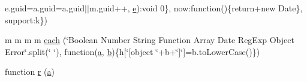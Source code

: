 \begin{DoxyCompactItemize}
e.\+guid=a.\+guid=a.\+guid$\vert$$\vert$m.\+guid++, \hyperlink{jquery_8canvasjs_8min_8js_a2c038346d47955cbe2cb91e338edd7e1}{e})\+:void 0\}, now\+:function()\{return+new Date\}, support\+:k\})
\item 
m m m m \hyperlink{jquery-1_811_82_8min_8js_a18d9b499a0765bf2fe5f372ff2fc0236}{each} (\char`\"{}Boolean Number String Function Array Date Reg\+Exp Object Error\char`\"{}.split(\char`\"{} \char`\"{}), function(\hyperlink{bootstrap_8min_8js_a1f5870dcf487187f13d5fd328ed9e6e7}{a}, \hyperlink{bootstrap_8min_8js_a398bb8542498d1b14178b02b99df309b}{b})\{h\mbox{[}\char`\"{}\mbox{[}object \char`\"{}+b+\char`\"{}\mbox{]}\char`\"{}\mbox{]}=b.\+to\+Lower\+Case()\})
\item 
function \hyperlink{jquery-1_811_82_8min_8js_a96f65b399314d93896076ceb474b6b9b}{r} (\hyperlink{bootstrap_8min_8js_a1f5870dcf487187f13d5fd328ed9e6e7}{a})
\end{DoxyCompactItemize}
